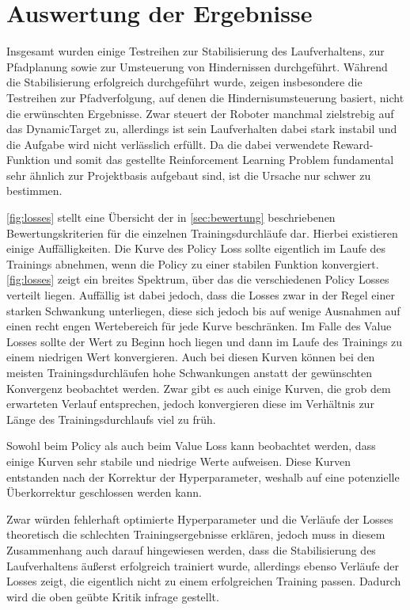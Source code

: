 \chapter{Auswertung der Ergebnisse}
Insgesamt wurden einige Testreihen zur Stabilisierung des Laufverhaltens, zur Pfadplanung sowie zur Umsteuerung von Hindernissen durchgeführt.
Während die Stabilisierung erfolgreich durchgeführt wurde, zeigen insbesondere die Testreihen zur Pfadverfolgung, auf denen die Hindernisumsteuerung basiert, nicht die erwünschten Ergebnisse.
Zwar steuert der Roboter manchmal zielstrebig auf das DynamicTarget zu, allerdings ist sein Laufverhalten dabei stark instabil und die Aufgabe wird nicht verlässlich erfüllt.
Da die dabei verwendete Reward-Funktion und somit das gestellte Reinforcement Learning Problem fundamental sehr ähnlich zur Projektbasis \cite{waidner.2020} aufgebaut sind, ist die Ursache nur schwer zu bestimmen.

\autoref{fig:losses} stellt eine Übersicht der in \autoref{sec:bewertung} beschriebenen Bewertungskriterien für die einzelnen Trainingsdurchläufe dar.
Hierbei existieren einige Auffälligkeiten.
Die Kurve des Policy Loss sollte eigentlich im Laufe des Trainings abnehmen, wenn die Policy zu einer stabilen Funktion konvergiert.
\autoref{fig:losses} zeigt ein breites Spektrum, über das die verschiedenen Policy Losses verteilt liegen.
Auffällig ist dabei jedoch, dass die Losses zwar in der Regel einer starken Schwankung unterliegen, diese sich jedoch bis auf wenige Ausnahmen auf einen recht engen Wertebereich für jede Kurve beschränken.
Im Falle des Value Losses sollte der Wert zu Beginn hoch liegen und dann im Laufe des Trainings zu einem niedrigen Wert konvergieren.
Auch bei diesen Kurven können bei den meisten Trainingsdurchläufen hohe Schwankungen anstatt der gewünschten Konvergenz beobachtet werden.
Zwar gibt es auch einige Kurven, die grob dem erwarteten Verlauf entsprechen, jedoch konvergieren diese im Verhältnis zur Länge des Trainingsdurchlaufs viel zu früh.

Sowohl beim Policy als auch beim Value Loss kann beobachtet werden, dass einige Kurven sehr stabile und niedrige Werte aufweisen.
Diese Kurven entstanden nach der Korrektur der Hyperparameter, weshalb auf eine potenzielle Überkorrektur geschlossen werden kann.

Zwar würden fehlerhaft optimierte Hyperparameter und die Verläufe der Losses theoretisch die schlechten Trainingsergebnisse erklären, jedoch muss in diesem Zusammenhang auch darauf hingewiesen werden, dass die Stabilisierung des Laufverhaltens äußerst erfolgreich trainiert wurde, allerdings ebenso Verläufe der Losses zeigt, die eigentlich nicht zu einem erfolgreichen Training passen.
Dadurch wird die oben geübte Kritik infrage gestellt.

